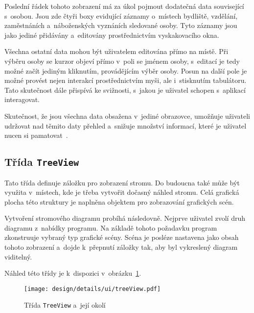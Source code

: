 		Poslední řádek tohoto zobrazení má za úkol pojmout dodatečná data související s~osobou. Jsou zde čtyři boxy evidující záznamy o~místech bydliště, vzdělání, zaměstnáních a~náboženských vyznáních sledované osoby. Tyto záznamy jsou jako jediné přidávány a~editovány prostřednictvím vyskakovacího okna.\par
		Všechna ostatní data mohou být uživatelem editována přímo na místě. Při výběru osoby se kurzor objeví přímo v~poli se jménem osoby, s~editací je tedy možné začít jediným kliknutím, provádějícím výběr osoby. Posun na další pole je možné provést nejen interakcí prostřednictvím myši, ale i~stisknutím tabulátoru. Tato skutečnost dále přispívá ke svižnosti, s~jakou je uživatel schopen s~aplikací interagovat.\par
		Skutečnost, že jsou všechna data obsažena v~jediné obrazovce, umožňuje uživateli udržovat nad těmito daty přehled a~snižuje množství informací, které je uživatel nucen si pamatovat~\cite{bib:DesignUI}.\par
		
		\subsection*{Třída \texttt{TreeView}}
		Tato třída definuje záložku pro zobrazení stromu. Do budoucna také může být využita v~místech, kde je třeba vytvořit dočasný náhled stromu. Celá grafická plocha této struktury je naplněna objektem pro zobrazování grafických scén. \par
		Vytvoření stromového diagramu probíhá následovně. Nejprve uživatel zvolí druh diagramu z~nabídky programu. Na základě tohoto požadavku program zkonstruuje vybraný typ grafické scény. Scéna je posléze nastavena jako obsah tohoto zobrazení a~dojde k~přepnutí záložky tak, aby byl vykreslený diagram viditelný.\par
		Náhled této třídy je k~dispozici v~obrázku~\ref{fig:designDetailTreeView}.\par
		\begin{figure}[h]
			\centering
			\texttt{[image: design/details/ui/treeView.pdf]}
			\caption{Třída \texttt{TreeView} a~její okolí}
			\label{fig:designDetailTreeView}
		\end{figure}
		
